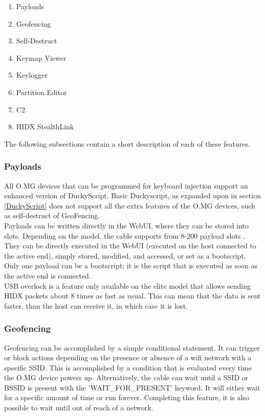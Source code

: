 \begin{enumerate}
    \item Payloads
    \item Geofencing
    \item Self-Destruct
    \item Keymap Viewer
    \item Keylogger
    \item Partition Editor
    \item C2
    \item HIDX StealthLink
\end{enumerate}

The following subsections contain a short description of each of these features. 

\subsubsection{Payloads}

All O.MG devices that can be programmed for keyboard injection support an enhanced version of DuckyScript. Basic Duckyscript, as expanded upon in section \ref{DuckyScript} does not support all the extra features of the O.MG devices, such as self-destruct of GeoFencing. \\
Payloads can be written directly in the WebUI, where they can be stored into slots. Depending on the model, the cable supports from 8-200 payload slots \cite{hak5MGCable}. They can be directly executed in the WebUI (executed on the host connected to the active end), simply stored, modified, and accessed, or set as a bootscript. Only one payload can be a bootscript; it is the script that is executed as soon as the active end is connected. \\
USB overlock is a feature only available on the elite model that allows sending HIDX packets about 8 times as fast as usual. This can mean that the data is sent faster, than the host can receive it, in which case it is lost. 


\subsubsection{Geofencing}

Geofencing can be accomplished by a simple conditional statement. It can trigger or block actions depending on the presence or absence of a wifi network with a specific SSID. This is accomplished by a condition that is evaluated every time the O.MG device powers up. Alternatively, the cable can wait until a SSID or BSSID is present with the 'WAIT\_FOR\_PRESENT' keyword. It will either wait for a specific amount of time or run forever. Completing this feature, it is also possible to wait until out of reach of a network.  

